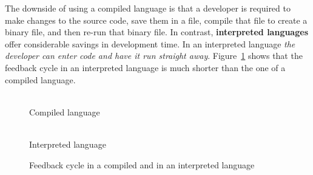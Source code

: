 \documentclass[12pt,a4paper,oneside,openright]{book}
\newcommand{\fig}[1]{Figure~\ref{fig:#1}}
\begin{document}
\begin{CJK}{UTF8}{}
The downside of using a compiled language is that a developer is required to make changes to the source code, save them in a file, compile that file to create a binary file, and then re-run that binary file. In contrast, \textbf{interpreted languages} offer considerable savings in development time. In an interpreted language \emph{the developer can enter code and have it run straight away}. \fig{cycle} shows that the feedback cycle in an interpreted language is much shorter than the one of a compiled language. 
\begin{figure}[htbp]
  \begin{center}
    \begin{minipage}[t]{.4\textwidth}
      \begin{center}
        \\
        Compiled language
      \end{center}
    \end{minipage}
    \hspace{1cm}
    \begin{minipage}[t]{.4\textwidth}
      \begin{center}
        \\
        Interpreted language
      \end{center}
    \end{minipage}
    \caption{Feedback cycle in a compiled and in an interpreted language\label{fig:cycle}}
  \end{center}
\end{figure}


\end{CJK}
\end{document}
